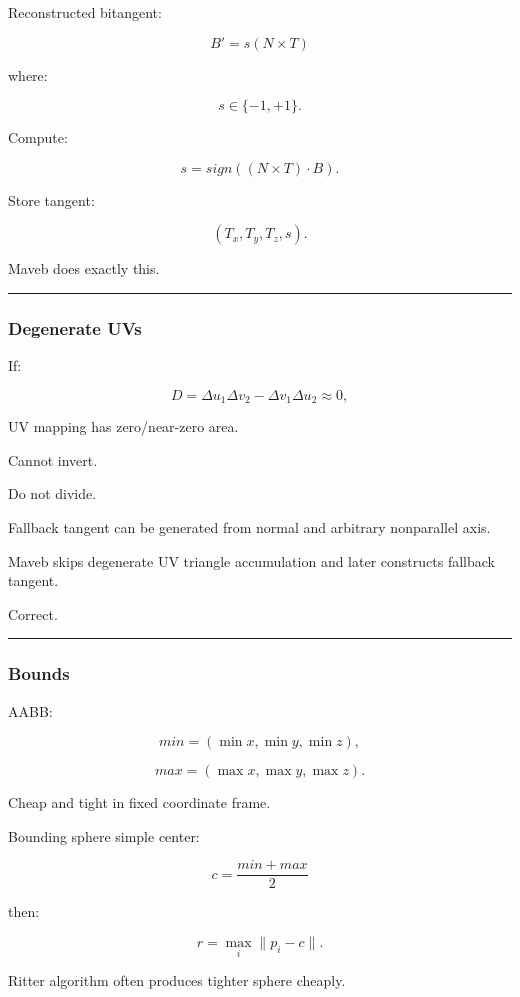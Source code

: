 Reconstructed bitangent:

\[
B'
=
s(N\times T)
\]

where:

\[
s\in\{-1,+1\}.
\]

Compute:

\[
\boxed{
s=
sign(
(N\times T)\cdot B
).
}
\]

Store tangent:

\[
(T_x,T_y,T_z,s).
\]

Maveb does exactly this.

\begin{center}\rule{0.5\linewidth}{0.5pt}\end{center}

\subsubsection{Degenerate UVs}\label{degenerate-uvs}

If:

\[
D
=
\Delta u_1\Delta v_2-
\Delta v_1\Delta u_2
\approx0,
\]

UV mapping has zero/near-zero area.

Cannot invert.

Do not divide.

Fallback tangent can be generated from normal and arbitrary nonparallel axis.

Maveb skips degenerate UV triangle accumulation and later constructs fallback tangent.

Correct.

\begin{center}\rule{0.5\linewidth}{0.5pt}\end{center}

\subsubsection{Bounds}\label{bounds}

AABB:

\[
min=
(\min x,\min y,\min z),
\]

\[
max=
(\max x,\max y,\max z).
\]

Cheap and tight in fixed coordinate frame.

Bounding sphere simple center:

\[
c=
\frac{min+max}{2}
\]

then:

\[
r=
\max_i\|p_i-c\|.
\]

Ritter algorithm often produces tighter sphere cheaply.

